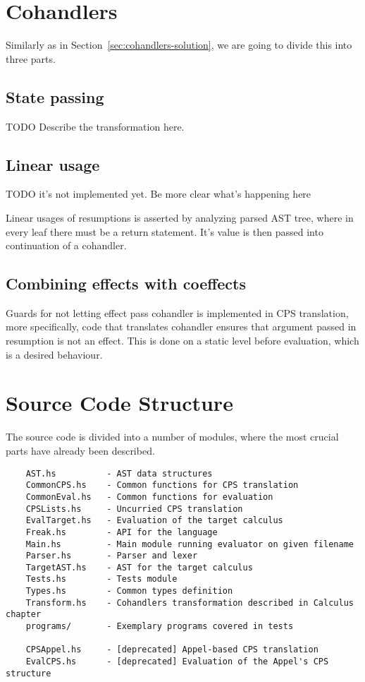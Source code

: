 \documentclass[declaration,shortabstract]{iithesis}
\theoremstyle{definition} \newtheorem{definition}{Definition}[chapter]
\theoremstyle{remark} \newtheorem{remark}[definition]{Observation}
\theoremstyle{plain} \newtheorem{theorem}[definition]{Theorem}
\theoremstyle{plain} \newtheorem{lemma}[definition]{Lemma}
\begin{document}
    \section{Cohandlers}

    Similarly as in Section~\ref{sec:cohandlers-solution}, we are going to
    divide this into three parts.

    \subsection{State passing}

    TODO Describe the transformation here.

    \subsection{Linear usage}

    TODO it's not implemented yet. Be more clear what's happening here

    Linear usages of resumptions is asserted by analyzing parsed AST tree,
    where in every leaf there must be a return statement. It's value is then
    passed into continuation of a cohandler.

    \subsection{Combining effects with coeffects}

    Guards for not letting effect pass cohandler is implemented in CPS
    translation, more specifically, code that translates cohandler ensures that
    argument passed in resumption is not an effect. This is done on a static
    level before evaluation, which is a desired behaviour.

    \section{Source Code Structure}

    The source code is divided into a number of modules, where the most
    crucial parts have already been described.

\begin{verbatim}
    AST.hs          - AST data structures
    CommonCPS.hs    - Common functions for CPS translation
    CommonEval.hs   - Common functions for evaluation
    CPSLists.hs     - Uncurried CPS translation
    EvalTarget.hs   - Evaluation of the target calculus
    Freak.hs        - API for the language
    Main.hs         - Main module running evaluator on given filename
    Parser.hs       - Parser and lexer
    TargetAST.hs    - AST for the target calculus
    Tests.hs        - Tests module
    Types.hs        - Common types definition
    Transform.hs    - Cohandlers transformation described in Calculus chapter
    programs/       - Exemplary programs covered in tests

    CPSAppel.hs     - [deprecated] Appel-based CPS translation
    EvalCPS.hs      - [deprecated] Evaluation of the Appel's CPS structure
\end{verbatim}
\end{document}
